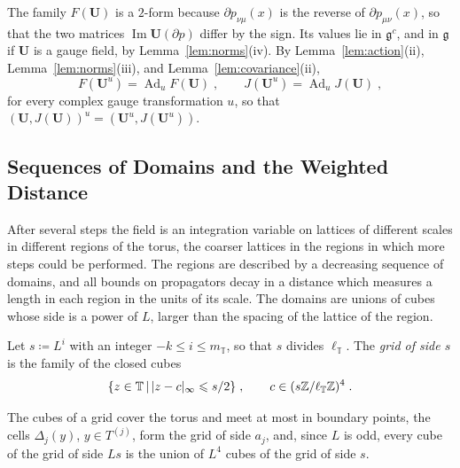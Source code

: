\documentclass[11pt]{preprint}
\newcommand{\im}{\operatorname{Im}}
\newcommand{\Ad}{\operatorname{Ad}}
\DeclarePairedDelimiter{\abs}{\lvert}{\rvert}
\numberwithin{equation}{section}
\begin{document}
The family $F(\mathbf U)$ is a $2$-form because $\partial p_{\nu\mu}(x)$ is the reverse of $\partial p_{\mu\nu}(x)$, so that the two matrices $\im\mathbf U(\partial p)$ differ by the sign. Its values lie in $\mathfrak g^c$, and in $\mathfrak g$ if $\mathbf U$ is a gauge field, by Lemma~\ref{lem:norms}(iv). By Lemma~\ref{lem:action}(ii), Lemma~\ref{lem:norms}(iii), and Lemma~\ref{lem:covariance}(ii),
\begin{equation}\label{eq:current-covariance}
    F(\mathbf U^u) = \Ad_uF(\mathbf U)\;,
    \qquad
    J(\mathbf U^u) = \Ad_uJ(\mathbf U)\;,
\end{equation}
for every complex gauge transformation $u$, so that $(\mathbf U, J(\mathbf U))^u = (\mathbf U^u, J(\mathbf U^u))$.

\subsection{Sequences of Domains and the Weighted Distance}\label{sec:sequences}

After several steps the field is an integration variable on lattices of different scales in different regions of the torus, the coarser lattices in the regions in which more steps could be performed. The regions are described by a decreasing sequence of domains, and all bounds on propagators decay in a distance which measures a length in each region in the units of its scale. The domains are unions of cubes whose side is a power of $L$, larger than the spacing of the lattice of the region.

\begin{definition}[Grids]\label{def:grids}
Let $s \coloneqq L^i$ with an integer $-k \leqslant i \leqslant m_{\mathbb T}$, so that $s$ divides $\ell_{\mathbb T}$. The \emph{grid of side $s$} is the family of the closed cubes
\[
    \{ z \in \mathbb T \,|\, \abs{z - c}_\infty \leqslant s/2 \}\;,
    \qquad
    c \in (s\mathbb Z/\ell_{\mathbb T}\mathbb Z)^4\;.
\]
\end{definition}

The cubes of a grid cover the torus and meet at most in boundary points, the cells $\Delta_j(y)$, $y \in T^{(j)}$, form the grid of side $a_j$, and, since $L$ is odd, every cube of the grid of side $Ls$ is the union of $L^4$ cubes of the grid of side $s$.
\end{document}
